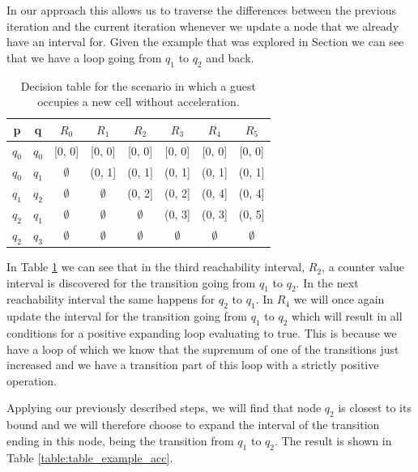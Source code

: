 \documentclass[12pt]{article}
\begin{document}
In our approach this allows us to traverse the differences between the previous iteration and the current iteration whenever we update a node that we already have an interval for. Given the example that was explored in Section  we can see that we have a loop going from $q_1$ to $q_2$ and back. 

\begin{table}[h]
	\begin{tabular}{ |c|c|c|c|c|c|c|c| }
		\hline
		p		& q 	& $R_0$ 		& $R_1$			& $R_2$			& $R_3$			& $R_4$ 		& $R_5$ \\
		\hline
		$q_0$	& $q_0$ & [0, 0] 		& [0, 0] 		& [0, 0] 		& [0, 0]		& [0, 0]		& [0, 0] \\
		$q_0$	& $q_1$ & $\emptyset$ 	& (0, 1]		& (0, 1] 		& (0, 1]		& (0, 1] 		& (0, 1] \\
		$q_1$	& $q_2$ & $\emptyset$ 	& $\emptyset$ 	& (0, 2] 		& (0, 2]		& (0, 4] 		& (0, 4] \\
		$q_2$	& $q_1$ & $\emptyset$ 	& $\emptyset$ 	& $\emptyset$	& (0, 3]		& (0, 3] 		& (0, 5] \\
		$q_2$	& $q_3$ & $\emptyset$ 	& $\emptyset$ 	& $\emptyset$	& $\emptyset$	& $\emptyset$	& $\emptyset$ \\
		\hline
	\end{tabular}
	\centering
	\caption{Decision table for the scenario in which a guest occupies a new cell without acceleration.}
	\label{table:table_example_no_acc}
\end{table}

In Table \ref{table:table_example_no_acc} we can see that in the third reachability interval, $R_2$, a counter value interval is discovered for the transition going from $q_1$ to $q_2$. In the next reachability interval the same happens for $q_2$ to $q_1$. In $R_4$ we will once again update the interval for the transition going from $q_1$ to $q_2$ which will result in all conditions for a positive expanding loop evaluating to true. This is because we have a loop of which we know that the supremum of one of the transitions just increased and we have a transition part of this loop with a strictly positive operation.

Applying our previously described steps, we will find that node $q_2$ is closest to its bound and we will therefore choose to expand the interval of the transition ending in this node, being the transition from $q_1$ to $q_2$. The result is shown in Table \ref{table:table_example_acc}.
\end{document}
